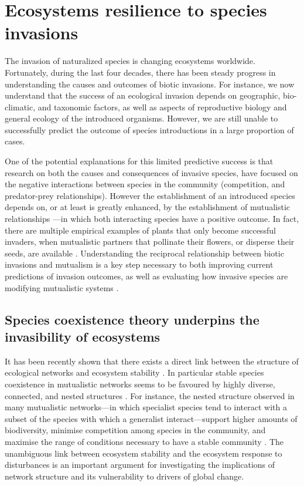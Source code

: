 \documentclass[a4paper]{article}
\begin{document}
\section{Ecosystems resilience to species invasions}

The invasion of naturalized species is changing ecosystems worldwide.
Fortunately, during the last four decades, there has been steady progress in understanding the causes and outcomes of biotic invasions.
For instance, we now understand that the success of an ecological invasion depends on geographic, bio-climatic, and taxonomic factors, as well as aspects of reproductive biology and general ecology of the introduced organisms.
However, we are still unable to successfully predict the outcome of species introductions in a large proportion of cases.

One of the potential explanations for this limited predictive success is that research on both the causes and consequences of invasive species, have focused on the negative interactions between species in the community (competition, and predator-prey relationships).
However the establishment of an introduced species depends on, or at least is greatly enhanced, by the establishment of  mutualistic relationships \cite{Richardson2000}---in which both interacting species have a positive outcome.
In fact, there are multiple empirical examples of plants that only become successful invaders, when mutualistic partners that pollinate their flowers, or disperse their seeds, are available \cite{Simberloff1999, Simberloff2006, Prior2014}.
Understanding the reciprocal relationship between biotic invasions and mutualism is a key step necessary to both improving current predictions of invasion outcomes, as well as evaluating how invasive species are modifying mutualistic systems \cite{Richardson2000}.

\subsection{Species coexistence theory underpins the invasibility of ecosystems}

It has been recently shown that there exists a direct link between the structure of ecological networks and ecosystem stability \cite{Bascompte2006,Rooney2006,Okuyama2008,Bastolla2009, Tylianakis2010, Thebault2010,Rohr2014,Sauve2014}.
In particular stable species coexistence in mutualistic networks seems to be favoured by highly diverse, connected, and nested structures \cite{Okuyama2008, Bastolla2009, Thebault2010, Sauve2014}.
For instance, the nested structure observed in many mutualistic networks---in which specialist species tend to interact with a subset of the species with which a generalist interact---support higher amounts of biodiversity, minimise competition among species in the community, and maximise the range of conditions necessary to have a stable community \cite{Bastolla2009, Rohr2014}.
The unambiguous link between ecosystem stability and the ecosystem response to disturbances is an important argument for investigating the implications of network structure and its vulnerability to drivers of global change.
\end{document}

